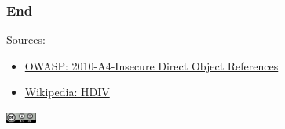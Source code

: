 \documentclass[aspectratio=169]{beamer}
\begin{document}
\begin{frame}
  \frametitle{End}
  Sources:\\
  \begin{itemize}
    \item \href{https://www.owasp.org/index.php/Top_10_2010-A4-Insecure_Direct_Object_References}{OWASP: 2010-A4-Insecure Direct Object References}
    \item \href{https://en.wikipedia.org/wiki/HDIV}{Wikipedia: HDIV}
  \end{itemize}

\includegraphics[width=1cm]{cc.png}
  
\end{frame}
\end{document}
